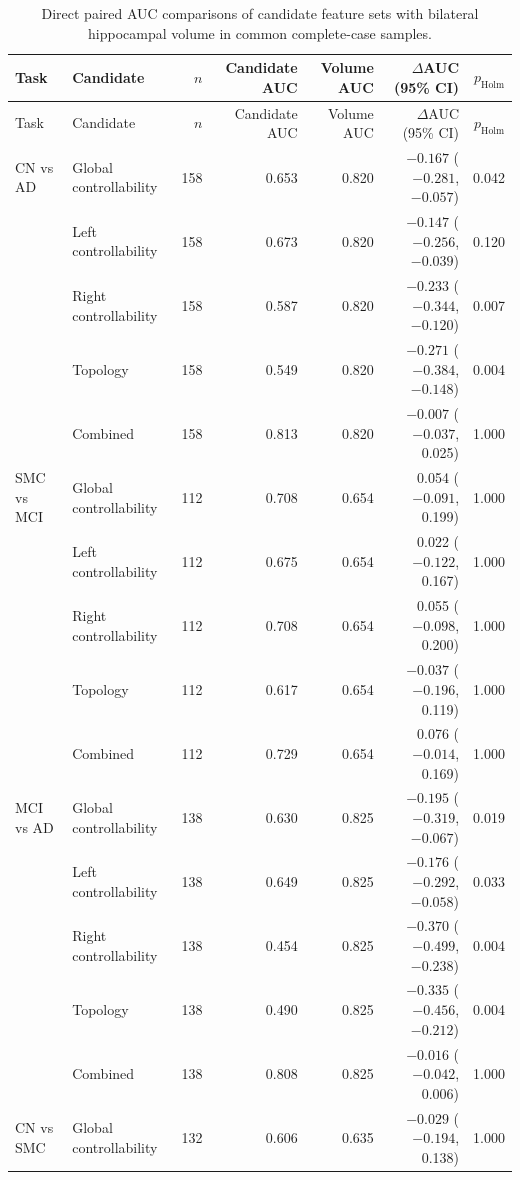 \documentclass{article}
\begin{document}
\begin{landscape}
\begin{longtable}{llrrrrr}
\caption{Direct paired AUC comparisons of candidate feature sets with bilateral hippocampal volume in common complete-case samples.}\label{tab:paired_volume_classification}\\
\toprule
Task & Candidate & $n$ & Candidate AUC & Volume AUC & $\Delta$AUC (95\% CI) & $p_{\mathrm{Holm}}$\\
\midrule
\endfirsthead
\toprule Task & Candidate & $n$ & Candidate AUC & Volume AUC & $\Delta$AUC (95\% CI) & $p_{\mathrm{Holm}}$\\ \midrule
\endhead
CN vs AD & Global controllability & 158 & 0.653 & 0.820 & $-0.167$ ($-0.281$, $-0.057$) & 0.042\\
& Left controllability & 158 & 0.673 & 0.820 & $-0.147$ ($-0.256$, $-0.039$) & 0.120\\
& Right controllability & 158 & 0.587 & 0.820 & $-0.233$ ($-0.344$, $-0.120$) & 0.007\\
& Topology & 158 & 0.549 & 0.820 & $-0.271$ ($-0.384$, $-0.148$) & 0.004\\
& Combined & 158 & 0.813 & 0.820 & $-0.007$ ($-0.037$, 0.025) & 1.000\\
\addlinespace
SMC vs MCI & Global controllability & 112 & 0.708 & 0.654 & 0.054 ($-0.091$, 0.199) & 1.000\\
& Left controllability & 112 & 0.675 & 0.654 & 0.022 ($-0.122$, 0.167) & 1.000\\
& Right controllability & 112 & 0.708 & 0.654 & 0.055 ($-0.098$, 0.200) & 1.000\\
& Topology & 112 & 0.617 & 0.654 & $-0.037$ ($-0.196$, 0.119) & 1.000\\
& Combined & 112 & 0.729 & 0.654 & 0.076 ($-0.014$, 0.169) & 1.000\\
\addlinespace
MCI vs AD & Global controllability & 138 & 0.630 & 0.825 & $-0.195$ ($-0.319$, $-0.067$) & 0.019\\
& Left controllability & 138 & 0.649 & 0.825 & $-0.176$ ($-0.292$, $-0.058$) & 0.033\\
& Right controllability & 138 & 0.454 & 0.825 & $-0.370$ ($-0.499$, $-0.238$) & 0.004\\
& Topology & 138 & 0.490 & 0.825 & $-0.335$ ($-0.456$, $-0.212$) & 0.004\\
& Combined & 138 & 0.808 & 0.825 & $-0.016$ ($-0.042$, 0.006) & 1.000\\
\addlinespace
CN vs SMC & Global controllability & 132 & 0.606 & 0.635 & $-0.029$ ($-0.194$, 0.138) & 1.000\\

\end{longtable}
\end{landscape}
\end{document}
